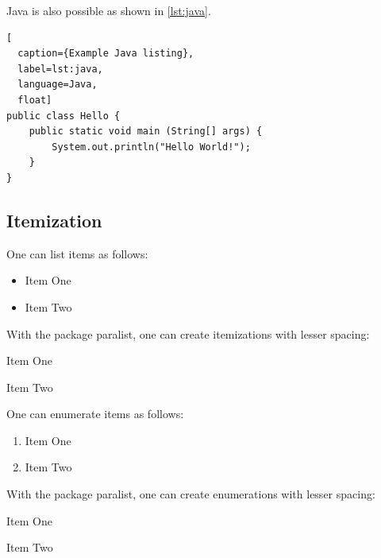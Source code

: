 Java is also possible as shown in \cref{lst:java}.

\begin{ltgexample}
\begin{lstlisting}[
  caption={Example Java listing},
  label=lst:java,
  language=Java,
  float]
public class Hello {
    public static void main (String[] args) {
        System.out.println("Hello World!");
    }
}
\end{lstlisting}
\end{ltgexample}

\subsection{Itemization}

One can list items as follows:

\begin{ltgexample}
\begin{itemize}
  \item Item One
  \item Item Two
\end{itemize}
\end{ltgexample}

With the package paralist, one can create itemizations with lesser spacing:

\begin{ltgexample}
\begin{compactitem}
  \item Item One
  \item Item Two
\end{compactitem}
\end{ltgexample}

One can enumerate items as follows:

\begin{ltgexample}
\begin{enumerate}
  \item Item One
  \item Item Two
\end{enumerate}
\end{ltgexample}

With the package paralist, one can create enumerations with lesser spacing:

\begin{ltgexample}
\begin{compactenum}
  \item Item One
  \item Item Two
\end{compactenum}
\end{ltgexample}

